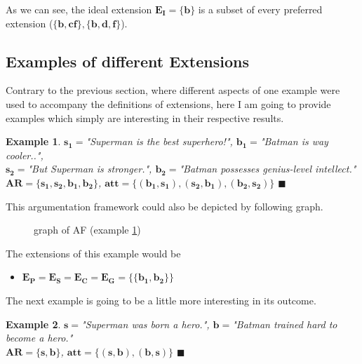 \documentclass[12pt]{report}
\numberwithin{figure}{chapter}
\theoremstyle{break}
\newtheorem{exmpl}{Example}[chapter]
\newenvironment{myexmpl}{\begin{exmpl}}{$\blacksquare$ \end{exmpl}}
\begin{document}
As we can see, the ideal extension $\bm{E_{I}=\{b\}}$ is a subset of every preferred extension ($\bm{\{b,cf\},\{b,d,f\}}$).

\subsection{Examples of different Extensions}
Contrary to the previous section, where different aspects of one example were used to accompany the definitions of extensions, 
here I am going to provide examples which simply are interesting in their respective results.

\begin{myexmpl}
$\bm{s_{1}=}$"Superman is the best superhero!", $\bm{b_{1}=}$"Batman is way cooler..",\\
$\bm{s_{2}=}$"But Superman is stronger.", $\bm{b_{2}=}$"Batman possesses genius-level intellect."\\
$\bm{AR = \{s_{1},s_{2},b_{1},b_{2}\}}$, $\bm{att = \{(b_{1},s_{1}),(s_{2},b_{1}),(b_{2},s_{2})\}}$
\label{s1 s2 b1 b2 ex}
\end{myexmpl}

This argumentation framework could also be depicted by following graph.

\begin{figure}[h!]
\begin{center}\end{center}
\caption{graph of AF (example \ref{s1 s2 b1 b2 ex})}
\end{figure}

\newpage

The extensions of this example would be 
\begin{itemize}
	\item{$\bm{E_{P}=E_{S}=E_{C}=E_{G}=\{\{b_{1},b_{2}\}\}}$}
\end{itemize}

The next example is going to be a little more interesting in its outcome.
\begin{myexmpl}
$\bm{s=}$"Superman was born a hero.", $\bm{b=}$"Batman trained hard to become a hero."\\
$\bm{AR=\{s,b\}}$, $\bm{att=\{(s,b),(b,s)\}}$
\label{s b ex}
\end{myexmpl}
\end{document}
